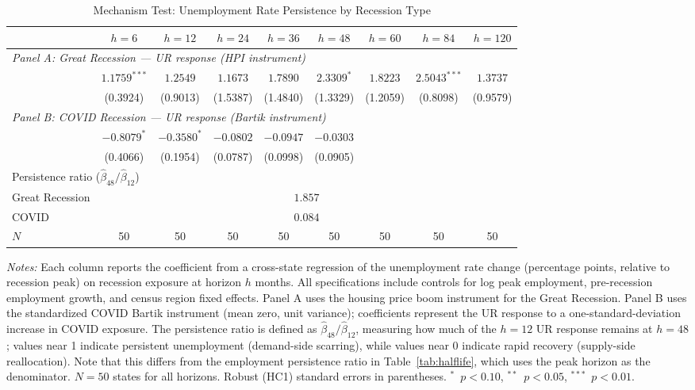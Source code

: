\begin{table}[H]
\centering
\caption{Mechanism Test: Unemployment Rate Persistence by Recession Type}
\begin{threeparttable}
\small
\begin{tabular}{lcccccccc}
\toprule
& $h=6$ & $h=12$ & $h=24$ & $h=36$ & $h=48$ & $h=60$ & $h=84$ & $h=120$ \\
\midrule
\multicolumn{9}{l}{\textit{Panel A: Great Recession --- UR response (HPI instrument)}} \\[3pt]
& $1.1759^{***}$ & $1.2549$ & $1.1673$ & $1.7890$ & $2.3309^{*}$ & $1.8223$ & $2.5043^{***}$ & $1.3737$ \\
& (0.3924) & (0.9013) & (1.5387) & (1.4840) & (1.3329) & (1.2059) & (0.8098) & (0.9579) \\
\midrule
\multicolumn{9}{l}{\textit{Panel B: COVID Recession --- UR response (Bartik instrument)}} \\[3pt]
& $-0.8079^{*}$ & $-0.3580^{*}$ & $-0.0802$ & $-0.0947$ & $-0.0303$ & & & \\
& (0.4066) & (0.1954) & (0.0787) & (0.0998) & (0.0905) & & & \\
\midrule
\multicolumn{9}{l}{Persistence ratio ($\hat{\beta}_{48} / \hat{\beta}_{12}$)} \\[3pt]
Great Recession & \multicolumn{8}{c}{$1.857$} \\
COVID & \multicolumn{8}{c}{$0.084$} \\
\midrule
$N$ & 50 & 50 & 50 & 50 & 50 & 50 & 50 & 50 \\
\bottomrule
\end{tabular}
\begin{tablenotes}[flushleft]
\small
\item \textit{Notes:} Each column reports the coefficient from a cross-state regression of the unemployment rate change (percentage points, relative to recession peak) on recession exposure at horizon $h$ months. All specifications include controls for log peak employment, pre-recession employment growth, and census region fixed effects. Panel A uses the housing price boom instrument for the Great Recession. Panel B uses the standardized COVID Bartik instrument (mean zero, unit variance); coefficients represent the UR response to a one-standard-deviation increase in COVID exposure. The persistence ratio is defined as $\hat{\beta}_{48} / \hat{\beta}_{12}$, measuring how much of the $h=12$ UR response remains at $h=48$; values near 1 indicate persistent unemployment (demand-side scarring), while values near 0 indicate rapid recovery (supply-side reallocation). Note that this differs from the employment persistence ratio in Table~\ref{tab:halflife}, which uses the peak horizon as the denominator. $N=50$ states for all horizons. Robust (HC1) standard errors in parentheses. $^{*}$~$p<0.10$, $^{**}$~$p<0.05$, $^{***}$~$p<0.01$.
\end{tablenotes}
\end{threeparttable}
\label{tab:mechanism}
\end{table}
